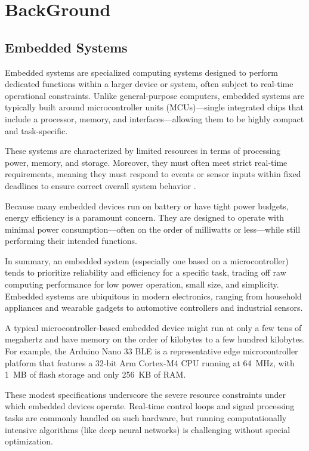 \chapter{BackGround}

\section{Embedded Systems}

Embedded systems are specialized computing systems designed to perform dedicated functions within a larger device or system, often subject to real-time operational constraints. Unlike general-purpose computers, embedded systems are typically built around microcontroller units (MCUs)---single integrated chips that include a processor, memory, and interfaces---allowing them to be highly compact and task-specific.

These systems are characterized by limited resources in terms of processing power, memory, and storage. Moreover, they must often meet strict real-time requirements, meaning they must respond to events or sensor inputs within fixed deadlines to ensure correct overall system behavior \cite{techtarget_embedded_system}.

Because many embedded devices run on battery or have tight power budgets, energy efficiency is a paramount concern. They are designed to operate with minimal power consumption---often on the order of milliwatts or less---while still performing their intended functions.

In summary, an embedded system (especially one based on a microcontroller) tends to prioritize reliability and efficiency for a specific task, trading off raw computing performance for low power operation, small size, and simplicity. Embedded systems are ubiquitous in modern electronics, ranging from household appliances and wearable gadgets to automotive controllers and industrial sensors.

A typical microcontroller-based embedded device might run at only a few tens of megahertz and have memory on the order of kilobytes to a few hundred kilobytes. For example, the Arduino Nano 33 BLE is a representative edge microcontroller platform that features a 32-bit Arm Cortex-M4 CPU running at 64~MHz, with 1~MB of flash storage and only 256~KB of RAM.

These modest specifications underscore the severe resource constraints under which embedded devices operate. Real-time control loops and signal processing tasks are commonly handled on such hardware, but running computationally intensive algorithms (like deep neural networks) is challenging without special optimization.

